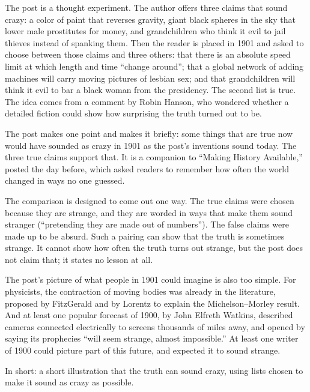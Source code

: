 \begin{afterword}
\summaryhead

The post is a thought experiment. The author offers three claims that sound crazy: a color of paint that reverses gravity, giant black spheres in the sky that lower male prostitutes for money, and grandchildren who think it evil to jail thieves instead of spanking them. Then the reader is placed in 1901 and asked to choose between those claims and three others: that there is an absolute speed limit at which length and time ``change around''; that a global network of adding machines will carry moving pictures of lesbian sex; and that grandchildren will think it evil to bar a black woman from the presidency. The second list is true. The idea comes from a comment by Robin Hanson, who wondered whether a detailed fiction could show how surprising the truth turned out to be.

\responsehead

The post makes one point and makes it briefly: some things that are true now would have sounded as crazy in 1901 as the post's inventions sound today. The three true claims support that. It is a companion to ``Making History Available,'' posted the day before, which asked readers to remember how often the world changed in ways no one guessed.

The comparison is designed to come out one way. The true claims were chosen because they are strange, and they are worded in ways that make them sound stranger (``pretending they are made out of numbers''). The false claims were made up to be absurd. Such a pairing can show that the truth is sometimes strange. It cannot show how often the truth turns out strange, but the post does not claim that; it states no lesson at all.

The post's picture of what people in 1901 could imagine is also too simple. For physicists, the contraction of moving bodies was already in the literature, proposed by FitzGerald and by Lorentz to explain the Michelson--Morley result. And at least one popular forecast of 1900, by John Elfreth Watkins, described cameras connected electrically to screens thousands of miles away, and opened by saying its prophecies ``will seem strange, almost impossible.'' At least one writer of 1900 could picture part of this future, and expected it to sound strange.

In short: a short illustration that the truth can sound crazy, using lists chosen to make it sound as crazy as possible.
\end{afterword}
